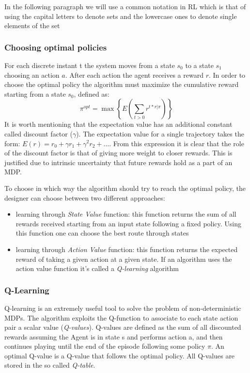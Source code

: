 In the following paragraph we will use a common notation in RL which is that of using the capital letters to denote sets and the lowercase ones to denote single elements of the set

\subsubsection{Choosing optimal policies}

For each discrete instant t the system moves from a state $s_{0}$ to a state $s_{1}$ choosing an action $a$. After each action the agent receives a reward $r$. 
In order to choose the optimal policy the algorithm must maximize the cumulative reward starting from a state $s_{0}$, defined as: 
\begin{equation}
\pi^{opt} = \max\left\{E\left(\sum_{t>0}r^{t*r|\pi}\right)\right\}
\end{equation}
It is worth mentioning that the expectation value has an additional constant called discount factor ($\gamma$).
The expectation value for a single trajectory takes the form: $E(r) = r_{0} + \gamma r_{1} + \gamma^{2} r_{2} + \ldots$.
From this expression it is clear that the role of the discount factor is that of giving more weight to closer rewards. This is justified due to intrinsic uncertainty that future rewards hold as a part of an MDP.

To choose in which way the algorithm should try to reach the optimal policy, the designer can choose between two different approaches:

\begin{itemize}
    \item learning through \emph{State Value} function: this function returns the sum of all rewards received starting from an input state following a fixed policy.
        Using this function one can choose the best route through states
    \item learning through \emph{Action Value} function: this function returns the expected reward of taking a given action at a given state.
        If an algorithm uses the action value function it's called a \emph{Q-learning} algorithm    
\end{itemize}

\subsubsection{Q-Learning} \label{Qlearning}

Q-learning is an extremely useful tool to solve the problem of non-deterministic MDPs.
The algorithm exploits the Q-function to associate to each state action pair a scalar value (\emph{Q-values}).
Q-values are defined as the sum of all discounted rewards assuming the Agent is in state s and performs action a, and then continues playing until the end of the episode following some policy $\pi$.
An optimal Q-value is a Q-value that follows the optimal policy. All Q-values are stored in the so called \emph{Q-table}.

